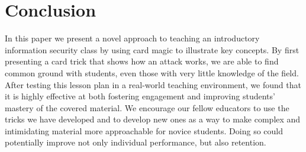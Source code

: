 \section{Conclusion}
\label{SEC:conclusion}

In this paper we present a novel approach to teaching
an introductory information security
class by using card magic to illustrate key concepts.
By first presenting a card trick that shows how an attack works,
we are able to find common ground with students,
even those with very little knowledge of the field.
After testing this lesson plan in a
real-world teaching environment,
we found that it is highly effective at both
fostering engagement and improving students' mastery of the covered
material.
We encourage our fellow educators to use the tricks we have developed and to
develop new ones as a way to make complex and intimidating
material more approachable for novice students.
Doing so could potentially improve not only individual performance, but also
retention.
